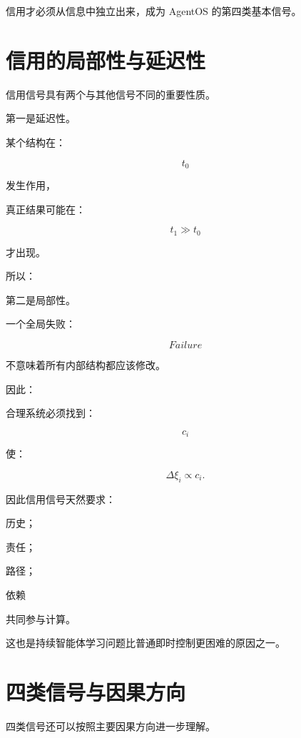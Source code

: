 信用才必须从信息中独立出来，成为 AgentOS 的第四类基本信号。

\section{信用的局部性与延迟性}

信用信号具有两个与其他信号不同的重要性质。

第一是延迟性。

某个结构在：

\[
t_0
\]

发生作用，

真正结果可能在：

\[
t_1\gg t_0
\]

才出现。

所以：

\begin{statementbox}
\centering
{}
\end{statementbox}

第二是局部性。

一个全局失败：

\[
Failure
\]

不意味着所有内部结构都应该修改。

因此：

\begin{statementbox}
\centering
{}
\end{statementbox}

合理系统必须找到：

\[
c_i
\]

使：

\[
\Delta\xi_i
\propto
c_i.
\]

因此信用信号天然要求：

历史；

责任；

路径；

依赖

共同参与计算。

这也是持续智能体学习问题比普通即时控制更困难的原因之一。

\section{四类信号与因果方向}

四类信号还可以按照主要因果方向进一步理解。

